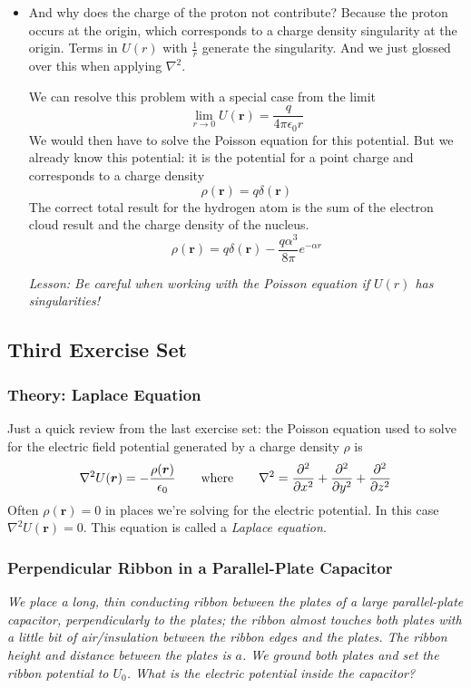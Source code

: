 \documentclass[11pt, a4paper]{article}
\newcommand{\eqtext}[1]{\qquad \text{#1} \qquad}
\renewcommand{\vec}[1]{\bm{#1}} %
\renewcommand{\r}{\vec{r}}
\newcommand{\e}{\epsilon_{0}}  %
\renewcommand{\laplacian}{\nabla^{2}}
\begin{document}
\begin{itemize}
	\item And why does the charge of the proton not contribute? Because the proton occurs at the origin, which corresponds to a charge density singularity at the origin. Terms in $ U(r) $ with $ \frac{1}{r} $ generate the singularity. And we just glossed over this when applying $ \nabla^{2} $. 
	
	We can resolve this problem with a special case from the limit
	\begin{equation*}
		\lim_{r\to 0}U(\r) = \frac{q}{4\pi \epsilon_{0} r}
	\end{equation*}
	We would then have to solve the Poisson equation for this potential. But we already know this potential: it is the potential for a point charge and corresponds to a charge density
	\begin{equation*}
		\rho(\r) = q \delta(\r)
	\end{equation*}
	The correct total result for the hydrogen atom is the sum of the electron cloud result and the charge density of the nucleus.
	\begin{equation*}
		\rho(\r) = q \delta(\r) - \frac{q\alpha^{3}}{8 \pi}e^{-\alpha r}
	\end{equation*}
	
	\textit{Lesson: Be careful when working with the Poisson equation if $ U(r) $ has singularities!}
	
\end{itemize}

\subsection{Third Exercise Set}

\subsubsection{Theory: Laplace Equation}
Just a quick review from the last exercise set: the Poisson equation used to solve for the electric field potential generated by a charge density $ \rho $ is
\begin{equation*}
	\nabla^{2}U(\r) = - \frac{\rho(\r)}{\e} \eqtext{where} \laplacian = \pdv[2]{}{x} + \pdv[2]{}{y} + \pdv[2]{}{z}
\end{equation*}
Often $ \rho(\r) = 0 $ in places we're solving for the electric potential. In this case $ \laplacian U(\r) = 0 $. This equation is called a \textit{Laplace equation}.

\subsubsection{Perpendicular Ribbon in a Parallel-Plate Capacitor}
\textit{We place a long, thin conducting ribbon between the plates of a large parallel-plate capacitor, perpendicularly to the plates; the ribbon almost touches both plates with a little bit of air/insulation between the ribbon edges and the plates. The ribbon height and distance between the plates is $ a $. We ground both plates and set the ribbon potential to $ U_{0} $. What is the electric potential inside the capacitor?}
\end{document}
